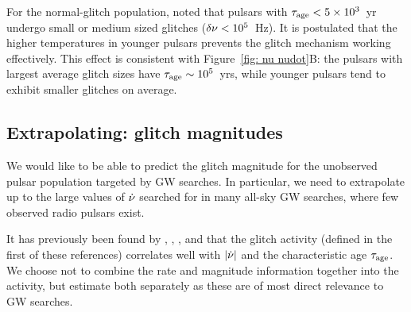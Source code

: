 \documentclass[../full_thesis/full_thesis.tex]{subfiles}
\begin{document}

For the normal-glitch population, \citet{Espinoza2011} noted that pulsars with
$\tau_{\mathrm{age}} < 5\times10^{3} $~yr undergo small or medium sized glitches
($\delta\nu < 10^{5}$~Hz).  It is postulated that the higher temperatures in
younger pulsars prevents the glitch mechanism working effectively. This effect
is consistent with Figure~\ref{fig: nu nudot}B: the pulsars with largest
average glitch sizes have $\tau_{\mathrm{age}} \sim 10^{5}$~yrs, while younger pulsars tend
to exhibit smaller glitches on average.

\subsection{Extrapolating: glitch magnitudes}

We would like to be able to predict the glitch magnitude for the unobserved
pulsar population targeted by GW searches. In particular, we need to
extrapolate up to the large values of $\dot{\nu}$ searched for in many all-sky
GW searches, where few observed radio pulsars exist.

It has previously been found by \citet{Mckenna1990}, \citet{Lyne2000},
\citet{Wang2000}, and \citet{Espinoza2011}
that the glitch activity (defined in the first of these references) correlates
well with $|\dot{\nu}|$ and the characteristic age
$\tau_{\mathrm{age}}$. We choose not to combine the rate and
magnitude information together into the activity, but estimate both separately
as these are of most direct relevance to GW searches.
\end{document}
